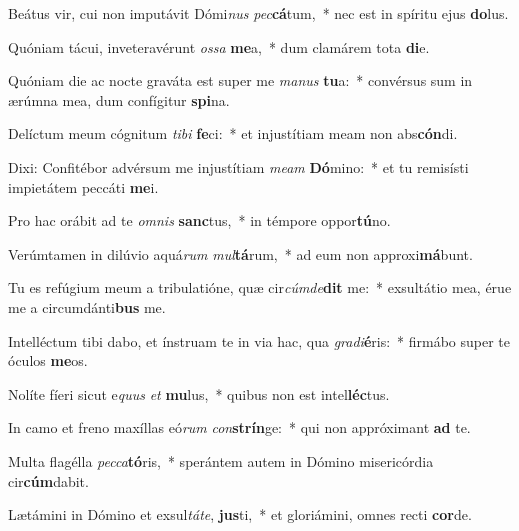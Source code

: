 \item Beátus vir, cui non imputávit Dómi\textit{nus} \textit{pec}\textbf{cá}tum,~* nec est in spíritu ejus \textbf{do}lus.
\item Quóniam tácui, inveteravérunt \textit{os}\textit{sa} \textbf{me}a,~* dum clamárem tota \textbf{di}e.
\item Quóniam die ac nocte graváta est super me \textit{ma}\textit{nus} \textbf{tu}a:~* convérsus sum in ærúmna mea, dum confígitur \textbf{spi}na.
\item Delíctum meum cógnitum \textit{ti}\textit{bi} \textbf{fe}ci:~* et injustítiam meam non abs\textbf{cón}di.
\item Dixi: Confitébor advérsum me injustítiam \textit{me}\textit{am} \textbf{Dó}mino:~* et tu remisísti impietátem peccáti \textbf{me}i.
\item Pro hac orábit ad te \textit{om}\textit{nis} \textbf{sanc}tus,~* in témpore oppor\textbf{tú}no.
\item Verúmtamen in dilúvio aquá\textit{rum} \textit{mul}\textbf{tá}rum,~* ad eum non approxi\textbf{má}bunt.
\item Tu es refúgium meum a tribulatióne, quæ cir\textit{cúm}\textit{de}\textbf{dit} me:~* exsultátio mea, érue me a circumdánti\textbf{bus} me.
\item Intelléctum tibi dabo, et ínstruam te in via hac, qua \textit{gra}\textit{di}\textbf{é}ris:~* firmábo super te óculos \textbf{me}os.
\item Nolíte fíeri sicut e\textit{quus} \textit{et} \textbf{mu}lus,~* quibus non est intel\textbf{léc}tus.
\item In camo et freno maxíllas eó\textit{rum} \textit{con}\textbf{strín}ge:~* qui non appróximant \textbf{ad} te.
\item Multa flagélla \textit{pec}\textit{ca}\textbf{tó}ris,~* sperántem autem in Dómino misericórdia cir\textbf{cúm}dabit.
\item Lætámini in Dómino et exsul\textit{tá}\textit{te}, \textbf{jus}ti,~* et gloriámini, omnes recti \textbf{cor}de.

